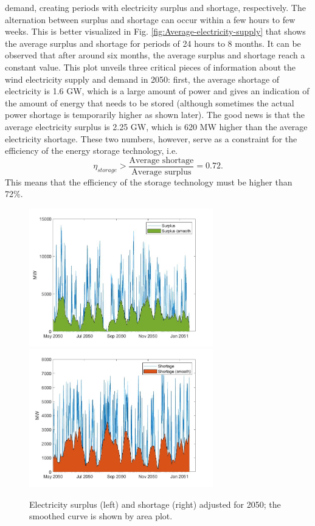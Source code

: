 \documentclass{ECOS_2021}
\begin{document}
demand, creating periods with electricity surplus and shortage, respectively.
The alternation between surplus and shortage can occur within a few
hours to few weeks. This is better visualized in Fig. \ref{fig:Average-electricity-supply}
that shows the average surplus and shortage for periods of 24 hours
to 8 months. It can be observed that after around six months, the
average surplus and shortage reach a constant value. This plot unveils
three critical pieces of information about the wind electricity supply
and demand in 2050: first, the average shortage of electricity is
1.6 GW, which is a large amount of power and gives an indication of
the amount of energy that needs to be stored (although sometimes the
actual power shortage is temporarily higher as shown later). The good
news is that the average electricity surplus is 2.25 GW, which is
620 MW higher than the average electricity shortage. These two numbers,
however, serve as a constraint for the efficiency of the energy storage
technology, i.e.
\[
\eta_{storage}>\frac{\text{Average shortage}}{\text{Average surplus}}=0.72.
\]
This means that the efficiency of the storage technology must be higher
than 72\%.

\begin{figure}[H]
\centering
\includegraphics[width=8cm]{smoothed_surplus}\includegraphics[width=8cm]{smoothed_deficit}

\caption{\label{fig:Electricity-surplus-smooth}Electricity surplus (left)
and shortage (right) adjusted for 2050; the smoothed curve is shown
by area plot.}
\end{figure}
\end{document}
